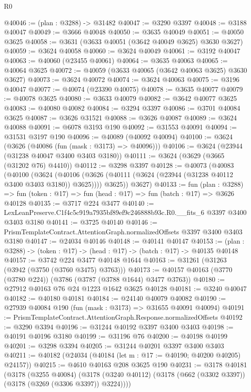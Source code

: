 \begin{lexlean}{R0}
\begin{coremodule}
@40046 := (plan : @3288) -> @31482
@40047 := @3290 @3397
@40048 := @3188 @40047
@40049 := @3666 @40048
@40050 := @3635 @40049
@40051 := @40050 @3625
@40058 := @3631 (@3633 @40051 (@3642 @40049 @3625) @3630 @3627)
@40059 := @3624 @40058
@40060 := @3624 @40049
@40061 := @3192 @40047
@40063 := @40060 (@23455 @40061)
@40064 := @3635 @40063
@40065 := @40064 @3625
@40072 := @40059 (@3633 @40065 (@3642 @40063 @3625) @3630 @3627)
@40073 := @3624 @40072
@40074 := @3624 @40063
@40075 := @3196 @40047
@40077 := @40074 (@23390 @40075)
@40078 := @3635 @40077
@40079 := @40078 @3625
@40080 := @3633 @40079
@40082 := @3642 @40077 @3625
@40083 := @40080 @40082
@40084 := @3294 @3397
@40086 := @3701 @40084 @3625
@40087 := @3626 @31521
@40088 := @3626 @40087
@40089 := @3624 @40088
@40091 := @6078 @3193 @190
@40092 := @31553 @40091
@40094 := @31531 @3197 @190
@40096 := @40089 (@40092 @40094)
@40100 := @3624 (@3626 (@40086 (fun (mask : @3173) => @40096)))
@40106 := @3624 (@23944 (@31238 @40047 @3400 @3403 @3180))
@40111 := @3624 (@3629 (@3665 (@31202 @76) @4410))
@40112 := @3298 @3397
@40128 := @40073
    (@40083
      (@40100
        (@3624
          (@40106 (@3626 (@40111 (@3624 (@23944 (@31238 @40112 @3400 @3403 @3180)) @3625))))
          @3625))
      @3627)
@40133 := fun (plan : @3288) =>
  fun (token : @17) => fun (head : @17) => fun (batch : @17) => @3626 @40128
@40135 := @3717 @224 @3477
@40140 := LexLeanPreserve.C1f4c5c919a7935bf89ef9c246888b93c.R0.__fits_6 @3397 @3400 @3403 @3180
@40141 := @3725 @40140
@40146 := PrismTemplateContract.AttentionGraph.normalizedOffsets @3397 @3400 @3403 @3180
@40147 := @24034 @40146
@40148 := @40141 @40147
@40153 := (plan : @3288) -> (token : @17) -> (head : @17) -> (batch : @17) -> @40135 @40148
@40157 := @3742 @224 @3477 @40148 @1644
@40163 := @31261 (@31263 (@3942 (@3750 (@3760 @3475) @3763)))
@40173 := @40157 @40163 (@3770 (@3780 @224)) (@3786 (@3787 (@3788 @1644) @3477 @3763))
@40180 := @27912 @40163 @76 @24 @1223 @1642 @3625 @40128
@40181 := @3240 @40047
@40182 := @40180 @40181
@40184 := @24140 @40079 @40082
@40190 := @27939 @40084 @190 (fun (mask : @3173) => @31655 @40091 @40094)
@40191 := PrismTemplateContract.AttentionGraph.Response.normalizedOffsets
@40192 := @3290 @3394
@40196 := @31244 @40192 @3397 @3400 @3403
@40198 := @40191 @40196 @3180
@40199 := @31196 @76
@40200 := @40198 @40199
@40201 := @3298 @3394
@40205 := @31244 @40201 @3397 @3400 @3403
@40211 := @40182 (@24034 (@40184 (let m : @17 := @40190; @40200 @40205) @24157))
@40215 := @4610 @40163 @208 @3625 @190
@40231 := @3178
    @40181
    (@3178
      (@3255 @40084)
      (@3178 (@3240 @40112) (@3178 (@662 (@3302 @3397)) (@3178 (@3269 (@3306 @3397)) @3224))))

\end{coremodule}
\end{lexlean}
